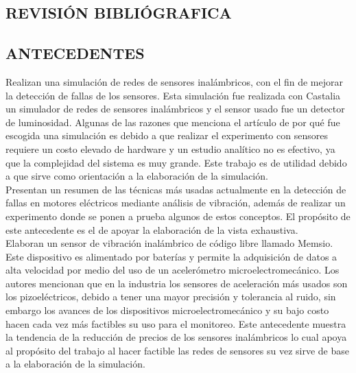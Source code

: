 
\begin{center}
	\section{REVISIÓN BIBLIÓGRAFICA}
\end{center}

\subsection{ANTECEDENTES}

\textcite{Pinto} Realizan una simulación de redes de sensores inalámbricos, con el fin de mejorar la detección de fallas de los sensores. Esta simulación fue realizada con Castalia un simulador de redes de sensores inalámbricos y el sensor usado fue un detector de luminosidad. Algunas de las razones que menciona el artículo de por qué fue escogida una simulación es debido a que realizar el experimento con sensores requiere un costo elevado de hardware y un estudio analítico no es efectivo, ya que la complejidad del sistema es muy grande. Este trabajo es de utilidad debido a que sirve como orientación a la elaboración de la simulación.\\


\textcite{Ugwiri} Presentan un resumen de las técnicas más usadas actualmente en la detección de fallas en motores eléctricos mediante análisis de vibración, además de realizar un experimento donde se ponen a prueba algunos de estos conceptos. El propósito de este antecedente es el de apoyar la elaboración de la vista exhaustiva.\\


\textcite{Koene} Elaboran un sensor de vibración inalámbrico de código libre llamado Memsio. Este dispositivo es alimentado por baterías y permite la adquisición de datos a alta velocidad por medio del uso de un acelerómetro microelectromecánico. Los autores mencionan que en la industria los sensores de aceleración más usados son los pizoeléctricos, debido a tener una mayor precisión y tolerancia al ruido, sin embargo los avances de los dispositivos microelectromecánico y su bajo costo hacen cada vez más factibles su uso para el monitoreo. Este antecedente muestra la tendencia de la reducción de precios de los sensores inalámbricos lo cual apoya al propósito del trabajo al hacer factible las redes de sensores su vez sirve de base a la elaboración de la simulación.
